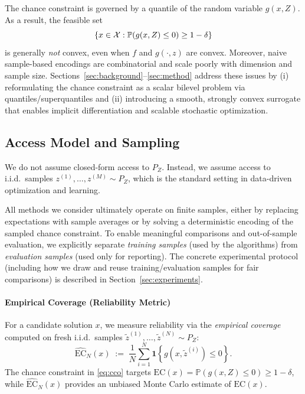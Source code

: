 \documentclass{uai2026} %
\theoremstyle{plain}
\theoremstyle{definition}
\begin{document}
The chance constraint is governed by a quantile of the random variable $g(x,Z)$.
As a result, the feasible set
\[
  \{x\in\mathcal{X}:\mathbb{P}(g(x,Z)\le 0)\ge 1-\delta\}
\]
is generally \emph{not} convex, even when $f$ and $g(\cdot,z)$ are convex.
Moreover, naive sample-based encodings are combinatorial and scale poorly with dimension and sample size.
Sections~\ref{sec:background}--\ref{sec:method} address these issues by (i) reformulating the chance constraint as a scalar bilevel problem via quantiles/superquantiles and (ii) introducing a smooth, strongly convex surrogate that enables implicit differentiation and scalable stochastic optimization.

\subsection{Access Model and Sampling}
We do not assume closed-form access to $P_Z$.
Instead, we assume access to i.i.d.\ samples $z^{(1)},\dots,z^{(M)}\sim P_Z$, which is the standard setting in data-driven optimization and learning.

All methods we consider ultimately operate on finite samples, either by replacing expectations with sample averages or by solving a deterministic encoding of the sampled chance constraint.
To enable meaningful comparisons and out-of-sample evaluation, we explicitly separate \emph{training samples} (used by the algorithms) from \emph{evaluation samples} (used only for reporting).
The concrete experimental protocol (including how we draw and reuse training/evaluation samples for fair comparisons) is described in Section~\ref{sec:experiments}.

\paragraph{Empirical Coverage (Reliability Metric)}
For a candidate solution $x$, we measure reliability via the \emph{empirical coverage} computed on fresh i.i.d.\ samples $\tilde z^{(1)},\dots,\tilde z^{(N)}\sim P_Z$:
\begin{equation}
  \widehat{\mathrm{EC}}_N(x)
  \;:=\;
  \frac{1}{N}\sum_{i=1}^N \mathbf{1}\!\left\{g\!\left(x,\tilde z^{(i)}\right)\le 0\right\}.\label{eq:ec}
\end{equation}
The chance constraint in \eqref{eq:cco} targets $\mathrm{EC}(x)=\mathbb{P}(g(x,Z)\le 0)\ge 1-\delta$, while $\widehat{\mathrm{EC}}_N(x)$ provides an unbiased Monte Carlo estimate of $\mathrm{EC}(x)$.
\end{document}
